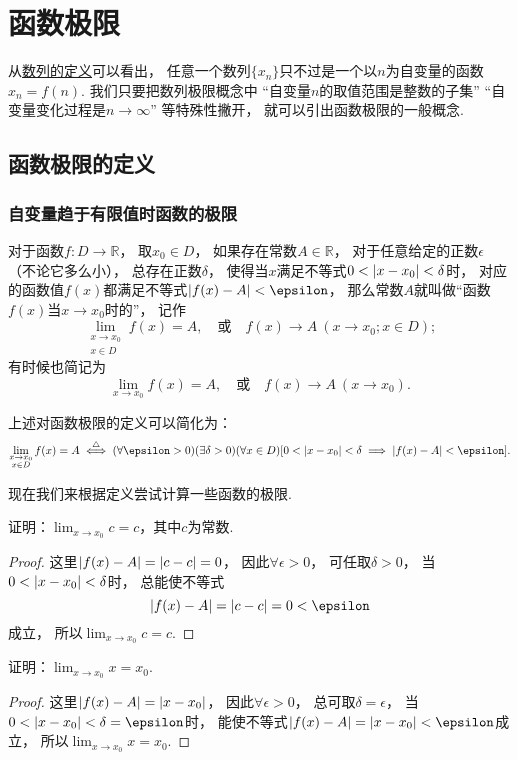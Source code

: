 \section{函数极限}
从\hyperref[definition.数列.数列的定义]{数列的定义}可以看出，
任意一个数列\(\{x_n\}\)只不过是一个以\(n\)为自变量的函数\(x_n = f(n)\).
我们只要把数列极限概念中
“自变量\(n\)的取值范围是整数的子集”
“自变量变化过程是\(n\to\infty\)”
等特殊性撇开，
就可以引出函数极限的一般概念.

\subsection{函数极限的定义}
\subsubsection*{自变量趋于有限值时函数的极限}
\begin{definition}\label{definition:极限.函数极限的定义1}
对于函数\(f\colon D\to\mathbb{R}\)，
取\(x_0 \in D\)，
如果存在常数\(A\in\mathbb{R}\)，
对于任意给定的正数\(\epsilon\)（不论它多么小），
总存在正数\(\delta\)，
使得当\(x\)满足不等式\(0 < \abs{x-x_0} < \delta\)时，
对应的函数值\(f(x)\)都满足不等式\(\abs{f(x)-A}<\epsilon\)，
那么常数\(A\)就叫做“函数\(f(x)\)当\(x \to x_0\)时的”，
记作
\[
	\lim_{\substack{x \to x_0 \\ x \in D}} f(x) = A,
	\quad\text{或}\quad
	f(x) \to A\ (x \to x_0; x \in D);
\]
有时候也简记为
\[
	\lim_{x \to x_0} f(x) = A,
	\quad\text{或}\quad
	f(x) \to A\ (x \to x_0).
\]
\end{definition}

上述对函数极限的定义可以简化为：
\[
	\lim_{\substack{x \to x_0 \\ x \in D}} f(x) = A
	\defiff
	(\forall \epsilon > 0)
	(\exists \delta > 0)
	(\forall x \in D)
	[0 < \abs{x - x_0} < \delta \implies \abs{f(x) - A} < \epsilon].
\]

现在我们来根据定义尝试计算一些函数的极限.
\begin{example}
证明：\(\lim_{x \to x_0} c = c\)，其中\(c\)为常数.
\begin{proof}
这里\(\abs{f(x) - A} = \abs{c - c} = 0\)，
因此\(\forall \epsilon > 0\)，
可任取\(\delta > 0\)，
当\(0 < \abs{x - x_0} < \delta\)时，
总能使不等式\[
	\abs{f(x) - A} = \abs{c - c} = 0 < \epsilon
\]成立，
所以\(\lim_{x \to x_0} c = c\).
\end{proof}
\end{example}

\begin{example}
证明：\(\lim_{x \to x_0} x = x_0\).
\begin{proof}
这里\(\abs{f(x) - A} = \abs{x - x_0}\)，
因此\(\forall \epsilon > 0\)，
总可取\(\delta = \epsilon\)，
当\(0 < \abs{x - x_0} < \delta = \epsilon\)时，
能使不等式\(\abs{f(x) - A} = \abs{x - x_0} < \epsilon\)成立，
所以\(\lim_{x \to x_0} x = x_0\).
\end{proof}
\end{example}

